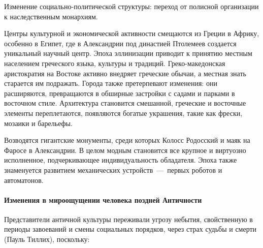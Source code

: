 Изменение социально-политической структуры: переход от полисной организации к наследственным монархиям. 

Центры культурной и экономической активности смещаются из Греции в Африку, особенно в Египет, где в Александрии под династией Птолемеев создается уникальный научный центр. Эпоха эллинизации приводит к принятию местным населением греческого языка, культуры и традиций. Греко-македонская аристократия на Востоке активно внедряет греческие обычаи, а местная знать старается им подражать. Города также претерпевают изменения: они расширяются, превращаются в обширные застройки с садами и парками в восточном стиле. Архитектура становится смешанной, греческие и восточные элементы переплетаются, появляются богатые украшения, такие как фрески, мозаики и барельефы. 

Возводятся гигантские монументы, среди которых Колосс Родосский и маяк на Фаросе в Александрии. В целом модным становится все крупное и виртуозно исполненное, подчеркивающее индивидуальность обладателя. Эпоха также знаменуется развитием механических устройств~---~первых роботов и автоматонов.



\paragraph{Изменения в мироощущении человека поздней Античности}


Представители античной культуры переживали угрозу небытия, свойственную в периоды завоеваний и смены социальных порядков, через страх судьбы и смерти (Пауль Тиллих), поскольку:

